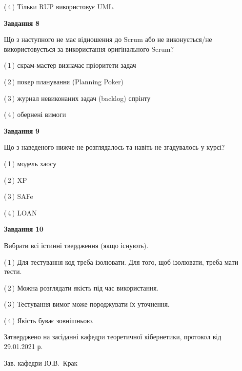 \documentclass[10pt, ukrainian]{article}
\begin{document}
{\begin {large}
(\,4\,) Тільки RUP використовує UML.%


{\begin {center}\textbf{Завдання 8}\end {center}}\par
Що з наступного не має відношення до Scrum або не виконується/не використовується за використання оригінального Scrum?\par
\vspace{2mm}



(\,1\,) скрам-мастер визначає пріоритети задач%



(\,2\,) покер планування (Planning Poker)%



(\,3\,) журнал невиконаних задач (backlog) спрінту%



(\,4\,) обернені вимоги%


{\begin {center}\textbf{Завдання 9}\end {center}}\par
Що з наведеного нижче не розглядалось та навіть не згадувалось у курсі?\par
\vspace{2mm}



(\,1\,) модель хаосу%



(\,2\,) XP%



(\,3\,) SAFe%



(\,4\,) LOAN%


{\begin {center}\textbf{Завдання 10}\end {center}}\par
Вибрати всі істинні твердження (якщо існують).\par
\vspace{2mm}



(\,1\,) Для тестування код треба ізолювати. Для того, щоб ізолювати, треба мати тести.%



(\,2\,) Можна розглядати якість під час використання.%



(\,3\,) Тестування вимог може породжувати їх уточнення.%



(\,4\,) Якість буває зовнішньою.%



\end {large}}
{\vspace{5mm}\smallskip \begin {small} Затверджено на засіданні кафедри теоретичної кібернетики, протокол  від   29.01.2021 р.\par\smallskip\smallskip
{\parbox {6.5 cm}{Зав. кафедри \dotfill Ю.В.~Крак}} \end{small}}
\newpage
\end{document}
